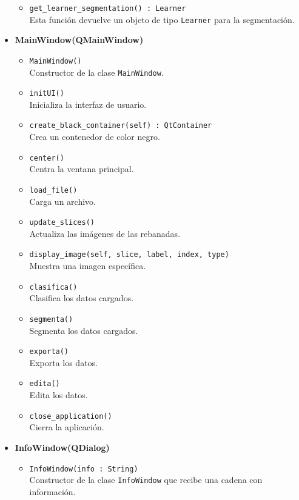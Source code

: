 \begin{itemize}
\begin{itemize}
		\item \texttt{get\_learner\_segmentation() : Learner} \\
		Esta función devuelve un objeto de tipo \texttt{Learner} para la segmentación.
	\end{itemize}
	
	\item \textbf{MainWindow(QMainWindow)}
	\begin{itemize}
		\item \texttt{MainWindow()} \\
		Constructor de la clase \texttt{MainWindow}.
		
		\item \texttt{initUI()} \\
		Inicializa la interfaz de usuario.
		
		\item \texttt{create\_black\_container(self) : QtContainer} \\
		Crea un contenedor de color negro.
		
		\item \texttt{center()} \\
		Centra la ventana principal.
		
		\item \texttt{load\_file()} \\
		Carga un archivo.
		
		\item \texttt{update\_slices()} \\
		Actualiza las imágenes de las rebanadas.
		
		\item \texttt{display\_image(self, slice, label, index, type)} \\
		Muestra una imagen específica.
		
		\item \texttt{clasifica()} \\
		Clasifica los datos cargados.
		
		\item \texttt{segmenta()} \\
		Segmenta los datos cargados.
		
		\item \texttt{exporta()} \\
		Exporta los datos.
		
		\item \texttt{edita()} \\
		Edita los datos.
		
		\item \texttt{close\_application()} \\
		Cierra la aplicación.
	\end{itemize}
	
	\item \textbf{InfoWindow(QDialog)}
	\begin{itemize}
		\item \texttt{InfoWindow(info : String)} \\
		Constructor de la clase \texttt{InfoWindow} que recibe una cadena con información.
	\end{itemize}
\end{itemize}


